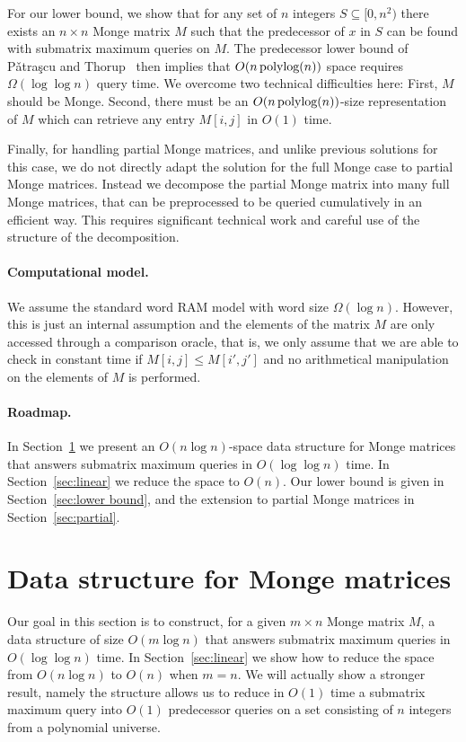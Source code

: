 \documentclass{llncs}
\newcommand{\polylog}{\text{\,polylog}}
\begin{document}
For our lower bound, we show that for any set of $n$ integers
$S\subseteq [0,n^{2})$ there exists an $n\times n$ Monge matrix $M$ such that the predecessor of $x$ in $S$
can be found with submatrix maximum queries on $M$. 
The predecessor lower bound of
P{\v{a}}tra{\c{s}}cu and Thorup~\cite{PT2006} then implies that $O(n \polylog(n))$ space requires  $\Omega(\log\log n)$ query time. 
We overcome two technical
difficulties here: First, $M$ should be Monge. Second, there must be an  $O(n\polylog(n))$-size representation of $M$ which can retrieve any entry $M[i,j]$ in $O(1)$ time. 

Finally, for handling partial Monge matrices, and unlike previous
solutions for this case, we do not directly adapt the solution for the
full Monge case to partial Monge matrices. Instead we decompose the partial Monge matrix into
many full Monge matrices, that can be preprocessed to be queried
cumulatively in an efficient way. This requires significant technical work and
careful use of the structure of the decomposition.

\paragraph{\bf Computational model.}
We assume the standard word RAM model with word size $\Omega(\log n)$. However,
this is just an internal assumption and the elements of the matrix $M$ are only accessed
through a comparison oracle, that is, we only assume that we are able to check in constant
time if $M[i,j] \leq M[i',j']$ and no arithmetical manipulation on the elements of $M$ is 
performed.

\paragraph{\bf Roadmap.}
In Section~\ref{sec:structure} we present an $O(n\log n)$-space data structure for Monge matrices that answers submatrix maximum queries in $O(\log \log n)$ time. In Section~\ref{sec:linear} we reduce the space to $O(n)$. Our lower bound is given in Section~\ref{sec:lower bound}, and the extension to partial Monge matrices in Section~\ref{sec:partial}.


\section{Data structure for Monge matrices}
\label{sec:structure}
Our goal in this section is to construct, for a given $m\times n$  Monge matrix $M$, a data structure
of size $O(m\log n)$ that answers submatrix maximum queries in $O(\log\log n)$ time. In Section~\ref{sec:linear}
we show how to reduce the space from $O(n\log n)$ to $O(n)$ when $m=n$.
We will actually show a stronger result, namely the structure allows us to reduce in $O(1)$ time
a submatrix maximum query into $O(1)$ predecessor queries on a set consisting of $n$ integers from
a polynomial universe.
\end{document}

